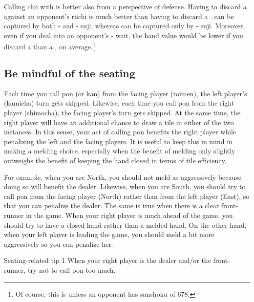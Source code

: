 \bigskip
Calling {\jap chii} with {\large{}} is better also from a perspective of defense. Having to discard a {\large{}} against an opponent's {\jap riichi} is much better than having to discard a {\large{}}. {\large{}} can be captured by both {\large{}-} and {\large{}-} {\jap suji}, whereas {\large{}} can be captured only by {\large{}-} {\jap suji}. Moreover, even if you deal into an opponent's {\large{}-} wait, the hand value would be lower if you discard a {\large{}} than a {\large{}}, on average.\footnote{Of course, this is unless an opponent has {\jap sanshoku} of 678.} 


\subsection{Be mindful of the seating}
Each time you call {\jap pon} (or {\jap kan}) from the facing player ({\jap toimen}), the left player's ({\jap kamicha}) turn gets skipped. Likewise, each time you call {\jap pon}  from the right player ({\jap shimocha}), the facing player's turn gets skipped. At the same time, the right player will have an additional chance to draw a tile in either of the two instances. In this sense, your act of calling {\jap pon} benefits the right player while penalizing the left and the facing players. 
It is useful to keep this in mind in making a melding choice, especially when the benefit of melding only slightly outweighs the benefit of keeping the hand closed in terms of tile efficiency.

\bigskip
For example, when you are North, you should not meld as aggressively because doing so will benefit the dealer. Likewise, when you are South, you should try to call {\jap pon} from the facing player (North) rather than from the left player (East), so that you can penalize the dealer. 
The same is true when there is a clear front-runner in the game. When your right player is much ahead of the game, you should try to have a closed hand rather than a melded hand. On the other hand, when your left player is leading the game, you should meld a bit more aggressively so you can penalize her. 

\begin{itembox}[c]{Seating-related tip 1}
When your right player is the dealer and/or the front-runner, try not to call {\jap pon} too much. 
\end{itembox}

